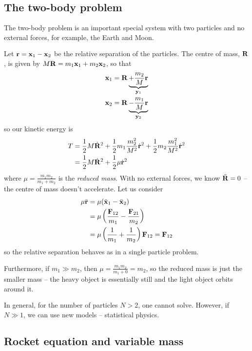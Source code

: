\documentclass{../template/note}
\begin{document}

    \subsection{The two-body problem}

    The two-body problem is an important special system with two particles and no external forces, for example, the Earth and Moon.

    Let \(\V r = \V x_1 - \V x_2\) be the relative separation of the particles. The centre of mass, \(\V R\), is given by \(M \V R = m_1 \V x_1 + m_2 \V x_2\), so that
    \begin{align*}
        \V x_1 &= \V R \underbrace{+ \frac{m_2} M \V r}_{\V y_1} \\
        \V x_2 &= \V R \underbrace{- \frac{m_1} M \V r}_{\V y_2}
    \end{align*}
    so our kinetic energy is
    \begin{align*}
        T &= \frac 1 2 M \dot{\V R}^2 + \frac 1 2 m_1 \frac{m_2^2}{M^2} \dot{\V r}^2 + \frac 1 2 m_2 \frac{m_1^2}{M^2} \dot{\V r}^2 \\ 
        &= \frac 1 2 M \dot{\V R}^2 + \frac 1 2 \mu \dot{\V r}^2
    \end{align*}
    where \(\mu = \frac{m_1m_2}{m_1 + m_2}\) is the \emph{reduced mass}. With no external forces, we know \(\ddot{\V R} = 0\) -- the centre of mass doesn't accelerate. Let us consider
    \begin{align*}
        \mu \ddot{\V r} &= \mu(\ddot{\V x}_1 - \ddot{\V x}_2) \\
        &= \mu \left(\frac{\V F_{12}}{m_1} - \frac{\V F_{21}}{m_2}\right) \\
        &= \mu \left(\frac 1 {m_1} + \frac 1 {m_2}\right) \V F_{12} = \V F_{12}
    \end{align*}
    so the relative separation behaves as in a single particle problem.

    Furthermore, if \(m_1 \gg m_2\), then \(\mu = \frac{m_1m_2}{m_1 + 0} = m_2\), so the reduced mass is just the smaller mass -- the heavy object is essentially still and the light object orbits around it.
    
    In general, for the number of particles \(N > 2\), one cannot solve. However, if \(N \gg 1\), we can use new models -- statistical physics.
    
    \subsection{Rocket equation and variable mass}
\end{document}
